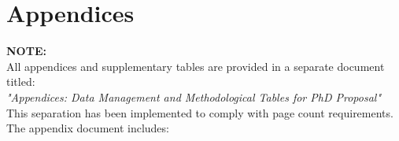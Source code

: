 \documentclass[12pt,a4paper]{article}
\begin{document}
\tableofcontents
\newpage



















\newpage
\section*{Appendices}
\begin{center}
\large\textbf{NOTE:} \\
\normalsize
All appendices and supplementary tables are provided in a separate document titled:\\
\textit{"Appendices: Data Management and Methodological Tables for PhD Proposal"}\\
\vspace{0.5cm}
This separation has been implemented to comply with page count requirements.\\
\vspace{0.5cm}
The appendix document includes:
\end{center}
\end{document}
